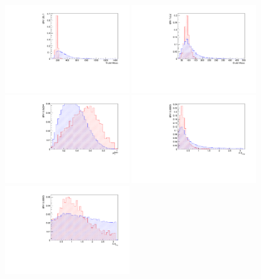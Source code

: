 \begin{figure}[ht!]
\centering
    \includegraphics[width=0.49\textwidth]{images/Run1/TriJetMass.pdf}
     \includegraphics[width=0.49\textwidth]{images/Run1/HadWMass.pdf}
    \includegraphics[width=0.49\textwidth]{images/Run1/ThSumPTVecPT.pdf}
     \includegraphics[width=0.49\textwidth]{images/Run1/AnThWh.pdf}
    \includegraphics[width=0.49\textwidth]{images/Run1/AnThBh.pdf}

\end{figure}
